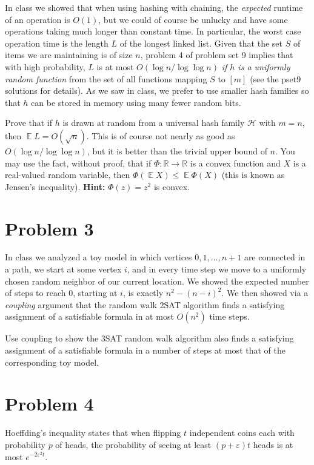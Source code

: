 \documentclass[12pt]{article}
\DeclareMathOperator*{\E}{\mathbb{E}}
\begin{document}
In class we showed that when using hashing with chaining, the {\em expected} runtime of an operation is $O(1)$, but we could of course be unlucky and have some operations taking much longer than constant time. In particular, the worst case operation time is the length $L$ of the longest linked list. Given that the set $S$ of items we are maintaining is of size $n$, problem 4 of problem set 9 implies that with high probability, $L$ is at most $O(\log n/\log\log n)$ {\em if $h$ is a uniformly random function} from the set of all functions mapping $S$ to $[m]$ (see the pset9 solutions for details). As we saw in class, we prefer to use smaller hash families so that $h$ can be stored in memory using many fewer random bits. 

Prove that if $h$ is drawn at random from a universal hash family $\mathcal{H}$ with $m=n$, then $\E L = O(\sqrt{n})$. This is of course not nearly as good as $O(\log n/\log\log n)$, but it is better than the trivial upper bound of $n$. You may use the fact, without proof, that if $\Phi:\mathbb{R}\rightarrow\mathbb{R}$ is a convex function and $X$ is a real-valued random variable, then $\Phi(\E X) \le \E \Phi(X)$ (this is known as Jensen's inequality). \textbf{Hint:} $\Phi(z) = z^2$ is convex.

\section*{Problem 3}

In class we analyzed a toy model in which vertices $0,1,\ldots,n+1$ are connected in a path, we start at some vertex $i$, and in every time step we move to a uniformly chosen random neighbor of our current location. We showed the expected number of steps to reach $0$, starting at $i$, is exactly $n^2 - (n-i)^2$. We then showed via a {\em coupling} argument that the random walk 2SAT algorithm finds a satisfying assignment of a satisfiable formula in at most $O(n^2)$ time steps.

Use coupling to show the 3SAT random walk algorithm also finds a satisfying assignment of a satisfiable formula in a number of steps at most that of the corresponding toy model.


\section*{Problem 4}
Hoeffding's inequality states that when flipping $t$ independent coins each with probability $p$ of heads, the probability of seeing at least $(p+\varepsilon)t$ heads is at most $e^{-2\varepsilon^2 t}$.
\end{document}
